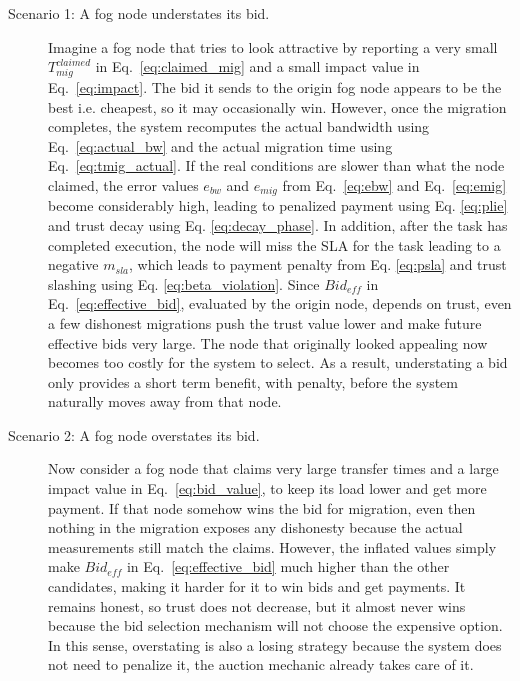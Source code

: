 \documentclass{article}
\begin{document}
\begin{description}

\item[Scenario 1: A fog node understates its bid.]
Imagine a fog node that tries to look attractive by reporting a very small \(T^{claimed}_{mig}\) in Eq.~\ref{eq:claimed_mig} and a small impact value in Eq.~\ref{eq:impact}. The bid it sends to the origin fog node appears to be the best i.e. cheapest, so it may occasionally win. However, once the migration completes, the system recomputes the actual bandwidth using Eq.~\ref{eq:actual_bw} and the actual migration time using Eq.~\ref{eq:tmig_actual}. If the real conditions are slower than what the node claimed, the error values \(e_{bw}\) and \(e_{mig}\) from Eq.~\ref{eq:ebw} and Eq.~\ref{eq:emig} become considerably high, leading to penalized payment using Eq. \ref{eq:plie} and trust decay using Eq. \ref{eq:decay_phase}. In addition, after the task has completed execution, the node will miss the SLA for the task leading to a negative $m_{sla}$, which leads to payment penalty from Eq. \ref{eq:psla} and trust slashing using Eq. \ref{eq:beta_violation}. Since \(Bid_{eff}\) in Eq.~\ref{eq:effective_bid}, evaluated by the origin node, depends on trust, even a few dishonest migrations push the trust value lower and make future effective bids very large. The node that originally looked appealing now becomes too costly for the system to select. As a result, understating a bid only provides a short term benefit, with penalty, before the system naturally moves away from that node.

\item[Scenario 2: A fog node overstates its bid.]
Now consider a fog node that claims very large transfer times and a large impact value in Eq.~\ref{eq:bid_value}, to keep its load lower and get more payment. If that node somehow wins the bid for migration, even then nothing in the migration exposes any dishonesty because the actual measurements still match the claims. However, the inflated values simply make \(Bid_{eff}\) in Eq.~\ref{eq:effective_bid} much higher than the other candidates, making it harder for it to win bids and get payments. It remains honest, so trust does not decrease, but it almost never wins because the bid selection mechanism will not choose the expensive option. In this sense, overstating is also a losing strategy because the system does not need to penalize it, the auction mechanic already takes care of it.


\end{description}
\end{document}
